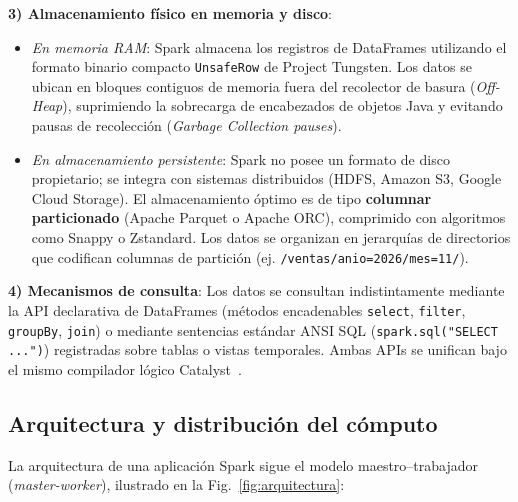 \documentclass[conference,a4paper]{IEEEtran}
\begin{document}
\textbf{3) Almacenamiento físico en memoria y disco}:
\begin{itemize}
\item \textit{En memoria RAM}: Spark almacena los registros de DataFrames utilizando el formato binario compacto \texttt{UnsafeRow} de Project Tungsten. Los datos se ubican en bloques contiguos de memoria fuera del recolector de basura (\textit{Off-Heap}), suprimiendo la sobrecarga de encabezados de objetos Java y evitando pausas de recolección (\textit{Garbage Collection pauses}).
\item \textit{En almacenamiento persistente}: Spark no posee un formato de disco propietario; se integra con sistemas distribuidos (HDFS, Amazon S3, Google Cloud Storage). El almacenamiento óptimo es de tipo \textbf{columnar particionado} (Apache Parquet o Apache ORC), comprimido con algoritmos como Snappy o Zstandard. Los datos se organizan en jerarquías de directorios que codifican columnas de partición (ej. \texttt{/ventas/anio=2026/mes=11/}).
\end{itemize}

\textbf{4) Mecanismos de consulta}: Los datos se consultan indistintamente mediante la API declarativa de DataFrames (métodos encadenables \texttt{select}, \texttt{filter}, \texttt{groupBy}, \texttt{join}) o mediante sentencias estándar ANSI SQL (\texttt{spark.sql("SELECT ...")}) registradas sobre tablas o vistas temporales. Ambas APIs se unifican bajo el mismo compilador lógico Catalyst~\cite{armbrust2015sparksql}.

\subsection{Arquitectura y distribución del cómputo}

La arquitectura de una aplicación Spark sigue el modelo maestro--trabajador (\textit{master-worker}), ilustrado en la Fig.~\ref{fig:arquitectura}:
\end{document}
